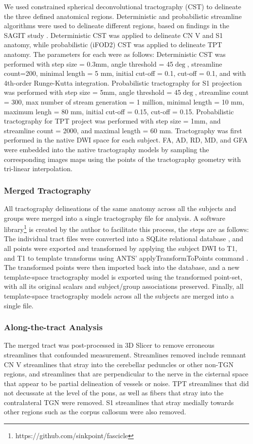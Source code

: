 We used constrained spherical deconvolutional tractography (CST) \cite{Tournier2012b} to delineate the three defined anatomical regions. Deterministic and probabilistic streamline algorithms were used to delineate different regions, based on findings in the SAGIT study \cite{Chen2016}. Deterministic CST was applied to delineate CN V and S1 anatomy, while probabilistic (iFOD2) CST \cite{Jeurissen2011b,Tournier2010} was applied to delineate TPT anatomy. The parameters for each were as follows: Deterministic CST was performed with step size = 0.3mm, angle threshold = 45$\deg$, streamline count=200, minimal length = 5 mm, initial cut-off = 0.1, cut-off = 0.1, and with 4th-order Runge-Kutta integration. Probabilistic tractography for S1 projection was performed with step size = 5mm, angle threshold = 45$\deg$, streamline count = 300, max number of stream generation = 1 million, minimal length = 10 mm, maximum lengh = 80 mm, initial cut-off = 0.15, cut-off = 0.15. Probabilistic tractography for TPT project was performed with step size = 1mm, and streamline count = 2000, and maximal length = 60 mm. Tractography was first performed in the native DWI space for each subject.  FA, AD, RD, MD, and GFA were embedded into the native tractography models by sampling the corresponding images maps using the points of the tractography geometry with tri-linear interpolation.

\subsubsection{Merged Tractography}
All tractography delineations of the same anatomy across all the subjects and groups were merged into a single tractography file for analysis. A software library\footnote{https://github.com/sinkpoint/fascicle} is created by the author to facilitate this process, the steps are as follows: The individual tract files were converted into a SQLite relational database \cite{owens2010sqlite}, and  all points were exported and transformed by applying the subject DWI to T1, and T1 to template transforms using ANTS' applyTransformToPoints command \cite{Avants2009}. The transformed points were then imported back into the  database, and a new template-space tractography model is exported using the transformed point-set, with all its original scalars and subject/group associations preserved. Finally, all template-space tractography models across all the subjects are merged into a single file. 

\subsubsection{Along-the-tract Analysis}
The merged tract was post-processed in 3D Slicer to remove erroneous streamlines that confounded measurement. Streamlines removed include remnant CN V streamlines that stray into the cerebellar peduncles or other non-TGN regions, and streamlines that are perpendicular to the nerve in the cisternal space that appear to be partial delineation of vessels or noise. TPT streamlines that did not decussate at the level of the pons, as well as fibers that stray into the contralateral TGN were removed. S1 streamlines that stray medially towards other regions such as the corpus callosum were also removed.


